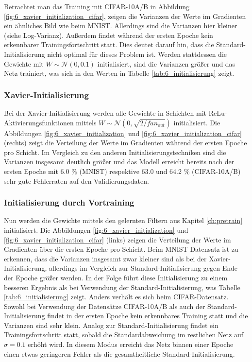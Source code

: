 Betrachtet man das Training mit CIFAR-10A/B in Abbildung \ref{fig:6_xavier_initialization_cifar}, zeigen die Varianzen der Werte im Gradienten ein ähnliches Bild wie beim MNIST. Allerdings sind die Varianzen hier kleiner (siehe Log-Varianz). Außerdem findet während der ersten Epoche kein erkennbarer Trainingsfortschritt statt. Dies deutet darauf hin, dass die Standard-Initialisierung nicht optimal für dieses Problem ist. Werden stattdessen die Gewichte mit $W \sim \mathcal{N} (0,0.1)$ initialisiert, sind die Varianzen größer und das Netz trainiert, was sich in den Werten in Tabelle \ref{tab:6_initialisierung} zeigt.


\subsubsection{Xavier-Initialisierung}
Bei der Xavier-Initialisierung werden alle Gewichte in Schichten mit ReLu-Aktivierungsfunktionen mittels $W \sim \mathcal{N} (0,\sqrt{2/fan_{out}})$ initialisiert. Die Abbildungen \ref{fig:6_xavier_initialization} und \ref{fig:6_xavier_initialization_cifar} (rechts) zeigt die Verteilung der Werte im Gradienten während der ersten Epoche pro Schicht. Im Vergleich zu den anderen Ini\-tialisierungstechniken sind die Varianzen insgesamt deutlich größer und das Modell erreicht bereits nach der ersten Epoche mit 6.0 \% (MNIST) respektive 63.0 und 64.2 \% (CIFAR-10A/B) sehr gute Fehlerraten auf den Validierungsdaten.

\subsubsection{Initialisierung durch Vortraining}
Nun werden die Gewichte mittels den gelernten Filtern aus Kapitel \ref{ch:pretrain} initialisiert. 
Die Abbildungen \ref{fig:6_xavier_initialization} und \ref{fig:6_xavier_initialization_cifar} (links) zeigen die Verteilung der Werte im Gradienten über die ersten Epoche pro Schicht. Beim MNIST-Datensatz ist zu erkennen, dass die Varianzen insgesamt zwar kleiner sind als bei der Xavier-Initialisierung, allerdings im Vergleich zur Standard-Initialisierung gegen Ende der Epoche größer werden. In der Folge führt diese Initialisierung zu einem besseren Ergebnis als bei Verwendung der Standard-Initialisierung, was Tabelle \ref{tab:6_initialisierung} zeigt. 
Anders verhält es sich beim CIFAR-Datensatz. Sowohl bei Verwendung der Datensätze CIFAR-10A/B als auch der Standard-Initialisierung findet in der ersten Epoche kein erkennbares Training statt und die Varianzen sind sehr klein. Analog zur Standard-Initialisierung findet ein Trainingsfortschritt statt, sobald die Standardabweichung im restlichen Netz auf $\sigma = 0.1$ erhöht wird. In diesem Modus erreicht das Netz binnen einer Epoche einen etwas geringeren Fehler als die gesamtheitliche Standard-Initialisierung.


